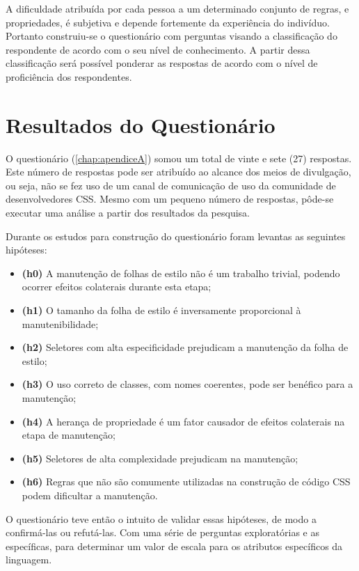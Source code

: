 A dificuldade atribuída por cada pessoa a um determinado conjunto de regras, e propriedades, é subjetiva e depende fortemente da experiência do indivíduo. Portanto construiu-se o questionário com perguntas visando a classificação do respondente de acordo com o seu nível de conhecimento. A partir dessa classificação será possível ponderar as respostas de acordo com o nível de proficiência dos respondentes.

\section{Resultados do Questionário}

O questionário (\autoref{chap:apendiceA}) somou um total de vinte e sete (27) respostas. Este número de respostas pode ser atribuído ao alcance dos meios de divulgação, ou seja, não se fez uso de um canal de comunicação de uso da comunidade de desenvolvedores CSS. Mesmo com um pequeno número de respostas, pôde-se executar uma análise a partir dos resultados da pesquisa. 

Durante os estudos para construção do questionário foram levantas as seguintes hipóteses:

\begin{itemize}
	\item \textbf{(h0)} A manutenção de folhas de estilo não é um trabalho trivial, podendo ocorrer efeitos colaterais durante esta etapa;
	\item \textbf{(h1)} O tamanho da folha de estilo é inversamente proporcional à manutenibilidade;
	\item \textbf{(h2)} Seletores com alta especificidade prejudicam a manutenção da folha de estilo;
	\item \textbf{(h3)} O uso correto de classes, com nomes coerentes, pode ser benéfico para a manutenção;
	\item \textbf{(h4)} A herança de propriedade é um fator causador de efeitos colaterais na etapa de manutenção;
	\item \textbf{(h5)} Seletores de alta complexidade prejudicam na manutenção;
	\item \textbf{(h6)} Regras que não são comumente utilizadas na construção de código CSS podem dificultar a manutenção.
\end{itemize}

O questionário teve então o intuito de validar essas hipóteses, de modo a confirmá-las ou refutá-las. Com uma série de perguntas exploratórias e as específicas, para determinar um valor de escala para os atributos específicos da linguagem.

